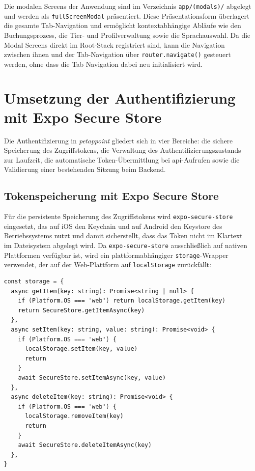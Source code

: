 Die modalen Screens der Anwendung sind im Verzeichnis \texttt{app/(modals)/} abgelegt und werden als \texttt{fullScreenModal} präsentiert. Diese Präsentationsform überlagert die gesamte Tab-Navigation und ermöglicht kontextabhängige Abläufe wie den Buchungsprozess, die Tier- und Profilverwaltung sowie die Sprachauswahl. Da die Modal Screens direkt im Root-Stack registriert sind, kann die Navigation zwischen ihnen und der Tab-Navigation über \texttt{router.navigate()} gesteuert werden, ohne dass die Tab Navigation dabei neu initialisiert wird.

\section{Umsetzung der Authentifizierung mit Expo Secure Store}
\label{sec:auth}

Die Authentifizierung in \textit{petappoint} gliedert sich in vier Bereiche: die sichere Speicherung des Zugriffstokens, die Verwaltung des Authentifizierungszustands zur Laufzeit, die automatische Token-Übermittlung bei \gls{api}-Aufrufen sowie die Validierung einer bestehenden Sitzung beim Backend.

\subsection{Tokenspeicherung mit Expo Secure Store}

Für die persistente Speicherung des Zugriffstokens wird \texttt{expo-secure-store} eingesetzt, das auf iOS den Keychain und auf Android den Keystore des Betriebssystems nutzt und damit sicherstellt, dass das Token nicht im Klartext im Dateisystem abgelegt wird. Da \texttt{expo-secure-store} ausschließlich auf nativen Plattformen verfügbar ist, wird ein plattformabhängiger \texttt{storage}-Wrapper verwendet, der auf der Web-Plattform auf \texttt{localStorage} zurückfällt:

\begin{listing}[H]
\begin{verbatim}
const storage = {
  async getItem(key: string): Promise<string | null> {
    if (Platform.OS === 'web') return localStorage.getItem(key)
    return SecureStore.getItemAsync(key)
  },
  async setItem(key: string, value: string): Promise<void> {
    if (Platform.OS === 'web') {
      localStorage.setItem(key, value)
      return
    }
    await SecureStore.setItemAsync(key, value)
  },
  async deleteItem(key: string): Promise<void> {
    if (Platform.OS === 'web') {
      localStorage.removeItem(key)
      return
    }
    await SecureStore.deleteItemAsync(key)
  },
}
\end{verbatim}
\caption{Plattformabhängiger Storage-Wrapper in authStore.ts}
\label{lst:storage-wrapper}
\end{listing}

